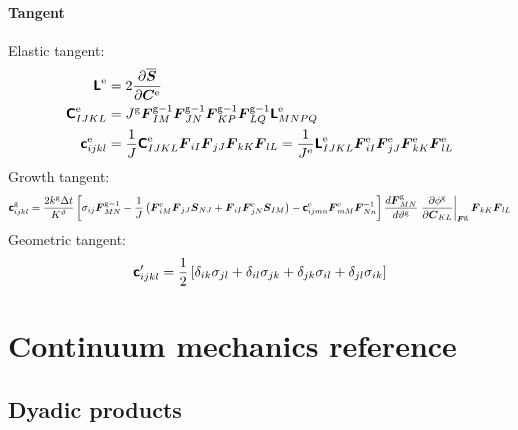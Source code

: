 \documentclass[10pt,letterpaper,oneside]{report}
\newcommand{\ten}[1]{\mbox{\boldmath $#1$}{}}
\newcommand{\tenf}[1]{\mbox{{\sffamily{\bfseries {#1}}}}}
\newcommand{\scas}[1]{\mbox{{\scriptsize{${\rm{#1}}$}}}{}}
\newcommand{\tens}[1]{\mbox{\boldmath{\scriptsize{$#1$}}}{}}
\begin{document}
\subsubsection{Tangent}
Elastic tangent:
\begin{align}
\tenf{L}^{\scas{e}} ={}& 2 \frac{\partial \overline{\ten{S}}}{\partial \ten{C}^{\scas{e}}} 
\\
\tenf{C}^{\scas{e}}_{IJKL} ={}& J^{\scas{g}} \ten{F}^{\scas{g}-1}_{IM} \ten{F}^{\scas{g}-1}_{JN} \ten{F}^{\scas{g}-1}_{KP} \ten{F}^{\scas{g}-1}_{LQ} \tenf{L}^{\scas{e}}_{MNPQ} 
\\ 
\tenf{c}^{\scas{e}}_{ijkl} ={}& \frac{1}{J} \tenf{C}^{\scas{e}}_{IJKL} \ten{F}_{iI} \ten{F}_{jJ} \ten{F}_{kK} \ten{F}_{lL} = \frac{1}{J^{\scas{e}}} \tenf{L}^{\scas{e}}_{IJKL} \ten{F}^{\scas{e}}_{iI} \ten{F}^{\scas{e}}_{jJ} \ten{F}^{\scas{e}}_{kK} \ten{F}^{\scas{e}}_{lL} 
\end{align}
Growth tangent:
\begin{equation}
\tenf{c}^{\scas{g}}_{ijkl} = \frac{2 k^{\scas{g}} \Delta t}{K^\vartheta} \left[ \sigma_{ij} \ten{F}^{\scas{g}-1}_{MN} 
- \frac{1}{J} \left( \ten{F}^{\scas{e}}_{iM} \ten{F}_{jJ} \ten{S}_{NJ} + \ten{F}_{iI} \ten{F}^{\scas{e}}_{jN} \ten{S}_{IM} \right)
- \tenf{c}^{\scas{e}}_{ijmn} \ten{F}^{\scas{e}}_{mM} \ten{F}^{-1}_{Nn} \right] 
\frac{d \ten{F}^{\scas{g}}_{MN}}{d \vartheta^{\scas{g}}} \left. \frac{\partial \phi^{\scas{g}} }{\partial \ten{C}_{KL}} \right|_{\tens{F}^{\scas{g}}} \ten{F}_{kK} \ten{F}_{lL} 
\end{equation}
Geometric tangent:
\begin{equation}
\tenf{c}'_{ijkl} = \frac{1}{2} \left[ \delta_{ik}\sigma_{jl} + \delta_{il}\sigma_{jk} + \delta_{jk}\sigma_{il} + \delta_{jl}\sigma_{ik} \right]  
\end{equation}




\appendix

\chapter{Continuum mechanics reference}

\section{Dyadic products} 
\end{document}
